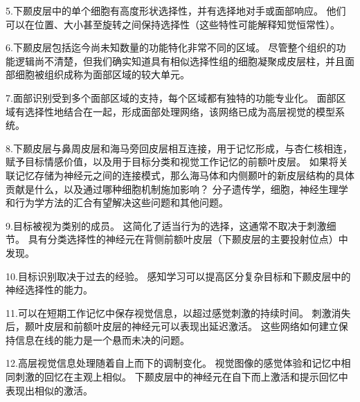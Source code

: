 5.下颞皮层中的单个细胞有高度形状选择性，并有选择地对手或面部响应。
他们可以在位置、大小甚至旋转之间保持选择性（这些特性可能解释知觉恒常性）。


6.下颞皮层包括迄今尚未知数量的功能特化非常不同的区域。
尽管整个组织的功能逻辑尚不清楚，但我们确实知道具有相似选择性组的细胞凝聚成皮层柱，并且面部细胞被组织成称为面部区域的较大单元。


7.面部识别受到多个面部区域的支持，每个区域都有独特的功能专业化。
面部区域有选择性地结合在一起，形成面部处理网络，该网络已成为高层视觉的模型系统。


8.下颞皮层与鼻周皮层和海马旁回皮层相互连接，用于记忆形成，与杏仁核相连，赋予目标情感价值，以及用于目标分类和视觉工作记忆的前额叶皮层。
如果将关联记忆存储为神经元之间的连接模式，那么海马体和内侧颞叶的新皮层结构的具体贡献是什么，以及通过哪种细胞机制施加影响？
分子遗传学，细胞，神经生理学和行为学方法的汇合有望解决这些问题和其他问题。


9.目标被视为类别的成员。
这简化了适当行为的选择，这通常不取决于刺激细节。
具有分类选择性的神经元在背侧前额叶皮层（下颞皮层的主要投射位点）中发现。


10.目标识别取决于过去的经验。
感知学习可以提高区分复杂目标和下颞皮层中的神经选择性的能力。


11.可以在短期工作记忆中保存视觉信息，以超过感觉刺激的持续时间。
刺激消失后，颞叶皮层和前额叶皮层的神经元可以表现出延迟激活。
这些网络如何建立保持信息在线的能力是一个悬而未决的问题。


12.高层视觉信息处理随着自上而下的调制变化。
视觉图像的感觉体验和记忆中相同刺激的回忆在主观上相似。
下颞皮层中的神经元在自下而上激活和提示回忆中表现出相似的激活。


